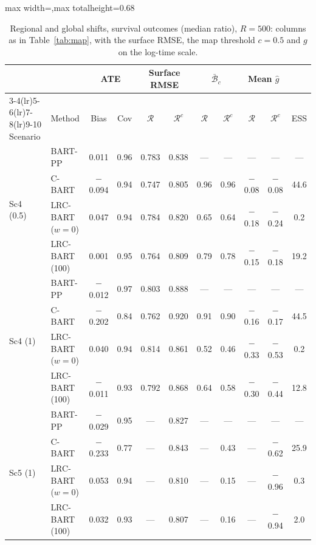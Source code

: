 \documentclass[11pt]{article}
\theoremstyle{definition}
\theoremstyle{plain}
\begin{document}
\begin{table}[htbp]
\centering
\singlespacing
\caption{Regional and global shifts, survival outcomes (median ratio), $R=500$: columns as in Table~\ref{tab:map}, with the surface RMSE, the map threshold $c=0.5$ and $g$ on the log-time scale.}
\label{tab:map_surv}
\scriptsize
\setlength{\tabcolsep}{3pt}
\renewcommand{\arraystretch}{0.8}
\begin{adjustbox}{max width=\textwidth,max totalheight=0.68\textheight}
\begin{tabular}{llccccccccc}
\toprule
& & \multicolumn{2}{c}{ATE} & \multicolumn{2}{c}{Surface RMSE} & \multicolumn{2}{c}{$\bar{\mathcal B}_c$} & \multicolumn{2}{c}{Mean $\hat g$} & \\
\cmidrule(lr){3-4}\cmidrule(lr){5-6}\cmidrule(lr){7-8}\cmidrule(lr){9-10}
Scenario & Method & Bias & Cov & $\mathcal R$ & $\mathcal R^c$ & $\mathcal R$ & $\mathcal R^c$ & $\mathcal R$ & $\mathcal R^c$ & ESS \\
\midrule
\multirow{4}{*}{Sc4 (0.5)} & BART-PP & 0.011 & 0.96 & 0.783 & 0.838 & --- & --- & --- & --- & --- \\
& C-BART & $-$0.094 & 0.94 & 0.747 & 0.805 & 0.96 & 0.96 & $-$0.08 & $-$0.08 & 44.6 \\
& LRC-BART ($w=0$) & 0.047 & 0.94 & 0.784 & 0.820 & 0.65 & 0.64 & $-$0.18 & $-$0.24 & 0.2 \\
& LRC-BART (100) & 0.001 & 0.95 & 0.764 & 0.809 & 0.79 & 0.78 & $-$0.15 & $-$0.18 & 19.2 \\
\midrule
\multirow{4}{*}{Sc4 (1)} & BART-PP & $-$0.012 & 0.97 & 0.803 & 0.888 & --- & --- & --- & --- & --- \\
& C-BART & $-$0.202 & 0.84 & 0.762 & 0.920 & 0.91 & 0.90 & $-$0.16 & $-$0.17 & 44.5 \\
& LRC-BART ($w=0$) & 0.040 & 0.94 & 0.814 & 0.861 & 0.52 & 0.46 & $-$0.33 & $-$0.53 & 0.2 \\
& LRC-BART (100) & $-$0.011 & 0.93 & 0.792 & 0.868 & 0.64 & 0.58 & $-$0.30 & $-$0.44 & 12.8 \\
\midrule
\multirow{4}{*}{Sc5 (1)} & BART-PP & $-$0.029 & 0.95 & --- & 0.827 & --- & --- & --- & --- & --- \\
& C-BART & $-$0.233 & 0.77 & --- & 0.843 & --- & 0.43 & --- & $-$0.62 & 25.9 \\
& LRC-BART ($w=0$) & 0.053 & 0.94 & --- & 0.810 & --- & 0.15 & --- & $-$0.96 & 0.3 \\
& LRC-BART (100) & 0.032 & 0.93 & --- & 0.807 & --- & 0.16 & --- & $-$0.94 & 2.0 \\
\bottomrule
\end{tabular}
\end{adjustbox}
\end{table}
\end{document}
